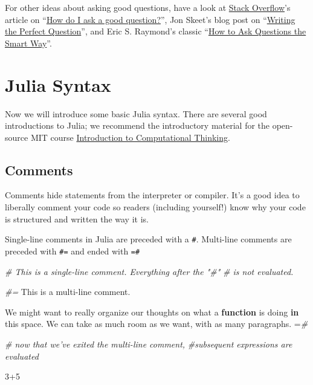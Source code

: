 \documentclass[
  11pt,
]{book}
\newenvironment{Shaded}{\begin{snugshade}}{\end{snugshade}}
\newcommand{\CommentTok}[1]{\textcolor[rgb]{0.37,0.37,0.37}{\textit{#1}}}
\newcommand{\FloatTok}[1]{\textcolor[rgb]{0.06,0.06,0.06}{#1}}
\newcommand{\KeywordTok}[1]{\textcolor[rgb]{0.27,0.27,0.27}{\textbf{#1}}}
\newcommand{\NormalTok}[1]{#1}
\begin{document}
For other ideas about asking good questions, have a look at \href{http://www.stackoverflow.com}{Stack Overflow}'s article on \enquote{\href{http://stackoverflow.com/help/how-to-ask}{How do I ask a good question?}}, Jon Skeet's blog post on \enquote{\href{https://codeblog.jonskeet.uk/2010/08/29/writing-the-perfect-question/}{Writing the Perfect Question}}, and Eric S. Raymond's classic \enquote{\href{http://www.catb.org/esr/faqs/smart-questions.html}{How to Ask Questions the Smart Way}}.

\hypertarget{julia-syntax}{%
\section{Julia Syntax}\label{julia-syntax}}

Now we will introduce some basic Julia syntax. There are several good introductions to Julia; we recommend the introductory material for the open-source MIT course \href{https://computationalthinking.mit.edu/Spring21/}{Introduction to Computational Thinking}.

\hypertarget{comments}{%
\subsection{Comments}\label{comments}}

Comments hide statements from the interpreter or compiler. It's a good idea to liberally comment your code so readers (including yourself!) know why your code is structured and written the way it is.

Single-line comments in Julia are preceded with a \texttt{\#}. Multi-line comments are preceded with \texttt{\#=} and ended with \texttt{=\#}

\begin{Shaded}
\begin{Highlighting}[]
\CommentTok{# This is a single-line comment. Everything after the "#"}
\CommentTok{#   is not evaluated.}

\CommentTok{#=}
\NormalTok{This is a multi-line comment.}

\NormalTok{We might want to really organize our thoughts on what a }
\KeywordTok{function}\NormalTok{ is doing }\KeywordTok{in}\NormalTok{ this space. We can take as much room }
\NormalTok{as we want, with as many paragraphs.}
\NormalTok{=}\CommentTok{#}

\CommentTok{# now that we've exited the multi-line comment, }
\CommentTok{#subsequent expressions are evaluated}

\FloatTok{3}\NormalTok{+}\FloatTok{5} 
\end{Highlighting}
\end{Shaded}
\end{document}
